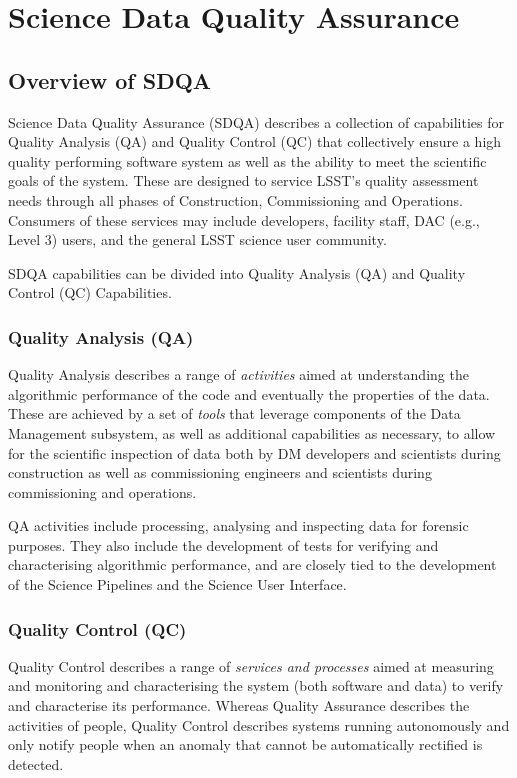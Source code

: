 \section{Science Data Quality Assurance}
\label{sec:sdqa}

\subsection{Overview of SDQA}

Science Data Quality Assurance (SDQA) describes a collection of
capabilities for Quality Analysis (QA) and Quality Control (QC) that
collectively ensure a high quality performing software system as well
as the ability to meet the scientific goals of the system. These are
designed to service LSST's quality assessment needs through all phases
of Construction, Commissioning and Operations. Consumers of these
services may include developers, facility staff, DAC (e.g., Level 3)
users, and the general LSST science user community.

SDQA capabilities can be divided into Quality Analysis (QA) and
Quality Control (QC) Capabilities.

\subsubsection{Quality Analysis (QA)}

Quality Analysis describes a range of \emph{activities} aimed at understanding the algorithmic performance of the code and eventually the properties of the data. These are achieved by a set of \emph{tools} that leverage components of the Data Management subsystem, as well as additional capabilities as necessary, to allow for the scientific inspection of data both by DM developers and scientists during construction as well as commissioning engineers and scientists during commissioning and operations.

QA activities include processing, analysing and inspecting data for forensic purposes. They also include the development of tests for verifying and characterising algorithmic performance, and are closely tied to the development of the Science Pipelines and the Science User Interface.

\subsubsection{Quality Control (QC)}

Quality Control describes a range of \emph{services and processes} aimed at measuring and monitoring and characterising the system (both software and data) to verify and characterise its performance. Whereas Quality Assurance describes the activities of people, Quality Control describes systems running autonomously and only notify people when an anomaly that cannot be automatically rectified is detected.

